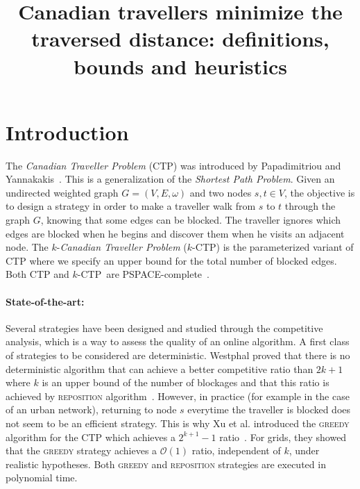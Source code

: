 \documentclass[a4paper, 10pt]{article}
\newcommand{\kctp}{$k$-CTP}
\begin{document}
\title{Canadian travellers minimize the traversed distance: definitions, bounds and heuristics}

\maketitle





\section{Introduction}

The \textit{Canadian Traveller Problem} (CTP) was introduced by Papadimitriou and Yannakakis~\cite{PaYa91}. This is a generalization of the \textit{Shortest Path Problem}. Given an undirected weighted graph $G=(V,E,\omega)$ and two nodes $s,t \in V$, the objective is to design a strategy in order to make a traveller walk from $s$ to $t$ through the graph $G$, knowing that some edges can be blocked. The traveller ignores which edges are blocked when he begins and discover them when he visits an adjacent node. The $k$-\textit{Canadian Traveller Problem} (\kctp) is the parameterized variant of CTP where we specify an upper bound for the total number of blocked edges. Both CTP and \kctp ~are PSPACE-complete~\cite{BaSc91,PaYa91}.

\paragraph{State-of-the-art:}Several strategies have been designed and studied through the competitive analysis, which is a way to assess the quality of an online algorithm. A first class of strategies to be considered are deterministic. Westphal proved that there is no deterministic algorithm that can achieve a better competitive ratio than $2k+1$ where $k$ is an upper bound of the number of blockages and that this ratio is achieved by \textsc{reposition} algorithm~\cite{We08}. However, in practice (for example in the case of an urban network), returning to node $s$ everytime the traveller is blocked does not seem to be an efficient strategy. This is why Xu et al. introduced the \textsc{greedy} algorithm for the CTP which achieves a $2^{k+1}-1$ ratio~\cite{XuHuSuZh09}. For grids, they showed that the \textsc{greedy} strategy achieves a $\mathcal{O}\left(1\right)$ ratio, independent of $k$, under realistic hypotheses. Both \textsc{greedy} and \textsc{reposition} strategies are executed in polynomial time.
\end{document}
